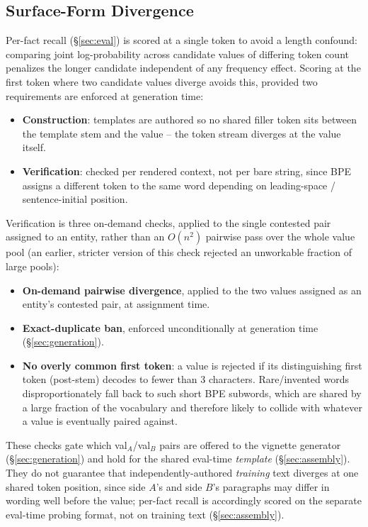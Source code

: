\documentclass[11pt]{article}
\begin{document}
\subsection{Surface-Form Divergence}
\label{sec:divergence}

Per-fact recall (\S\ref{sec:eval}) is scored at a single token to avoid a
length confound: comparing joint log-probability across candidate values of
differing token count penalizes the longer candidate independent of any
frequency effect. Scoring at the first token where two candidate values
diverge avoids this, provided two requirements are enforced at generation
time:

\begin{itemize}
  \item \textbf{Construction}: templates are authored so no shared filler
    token sits between the template stem and the value -- the token stream
    diverges at the value itself.
  \item \textbf{Verification}: checked per rendered context, not per bare
    string, since BPE assigns a different token to the same word depending
    on leading-space / sentence-initial position.
\end{itemize}

Verification is three on-demand checks, applied to the single contested pair
assigned to an entity, rather than an $O(n^2)$ pairwise pass over the whole
value pool (an earlier, stricter version of this check rejected an
unworkable fraction of large pools):
\begin{itemize}
  \item[(a)] \textbf{On-demand pairwise divergence}, applied to the two
    values assigned as an entity's contested pair, at assignment time.
  \item[(b)] \textbf{Exact-duplicate ban}, enforced unconditionally at
    generation time (\S\ref{sec:generation}).
  \item[(c)] \textbf{No overly common first token}: a value is rejected if
    its distinguishing first token (post-stem) decodes to fewer than 3
    characters. Rare/invented words disproportionately fall back to such
    short BPE subwords, which are shared by a large fraction of the
    vocabulary and therefore likely to collide with whatever a value is
    eventually paired against.
\end{itemize}

These checks gate which val$_A$/val$_B$ pairs are offered to the vignette
generator (\S\ref{sec:generation}) and hold for the shared eval-time
\emph{template} (\S\ref{sec:assembly}). They do not guarantee that
independently-authored \emph{training} text diverges at one shared token
position, since side $A$'s and side $B$'s paragraphs may differ in wording
well before the value; per-fact recall is accordingly scored on the separate
eval-time probing format, not on training text (\S\ref{sec:assembly}).
\end{document}
